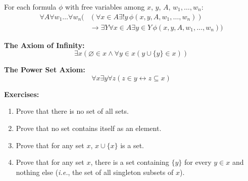 \documentclass{article}
\begin{document}
For each formula $\phi$ with free variables among $x$, $y$, $A$, $w_1,\hdots, w_n$:
\begin{align*}
	\forall A\forall w_1\hdots\forall w_n (&(\forall x\in A\exists!y\,\phi(x,y,A,w_1,\hdots,w_n))\\
	&\rightarrow \exists Y\forall x\in A\exists y\in Y\,\phi(x,y,A,w_1,\hdots,w_n))
\end{align*}


\vfill





\clearpage


\textbf{The Axiom of Infinity:}\bigskip
\[\exists x(\varnothing\in x\wedge \forall y\in x(y\cup\{y\}\in x))\]

\vfill



\textbf{The Power Set Axiom:}\bigskip
\[\forall x\exists y\forall z(z\in y\leftrightarrow z\subseteq x)\]

\vfill







\clearpage



\textbf{Exercises:}

\vspace{5mm}


\begin{enumerate}
	\item Prove that there is no set of all sets.
	\item Prove that no set contains itself as an element.
	\item Prove that for any set $x$, $x\cup\{x\}$ is a set.
	\item Prove that for any set $x$, there is a set containing $\{y\}$ for every $y\in x$ and nothing else (\textit{i.e.}, the set of all singleton subsets of $x$).
\end{enumerate}
\end{document}
